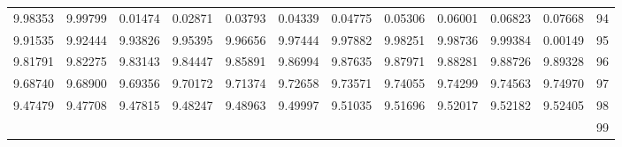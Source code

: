 \begin{center}
\begin{tabular}{|rrrrrrrrrrr|r|}
9.98353&9.99799&0.01474&0.02871&0.03793&0.04339&0.04775&0.05306&0.06001&0.06823&0.07668&94\\[5pt]
9.91535&9.92444&9.93826&9.95395&9.96656&9.97444&9.97882&9.98251&9.98736&9.99384&0.00149&95\\
9.81791&9.82275&9.83143&9.84447&9.85891&9.86994&9.87635&9.87971&9.88281&9.88726&9.89328&96\\
9.68740&9.68900&9.69356&9.70172&9.71374&9.72658&9.73571&9.74055&9.74299&9.74563&9.74970&97\\
9.47479&9.47708&9.47815&9.48247&9.48963&9.49997&9.51035&9.51696&9.52017&9.52182&9.52405&98\\
&&&&&&&&&&&99\\
\hline\end{tabular}
\end{center}
